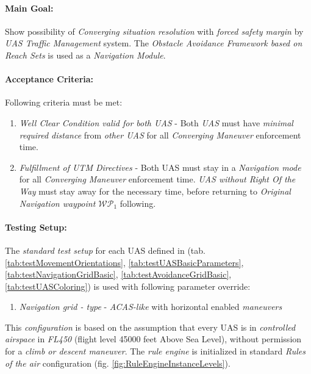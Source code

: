 \paragraph{Main Goal:} Show possibility of \emph{Converging situation resolution} with \emph{forced safety margin} by \emph{UAS Traffic Management} system.  The \emph{Obstacle Avoidance Framework based on Reach Sets} is used as a \emph{Navigation Module}.

\paragraph{Acceptance  Criteria:} Following criteria must be met:

\begin{enumerate}
	\item \emph{Well Clear Condition valid for both UAS} - Both \emph{UAS} must have \emph{minimal required distance} from \emph{other UAS} for all \emph{Converging Maneuver} enforcement time.
	
	\item \emph{Fulfillment of UTM Directives} - Both UAS must stay in a \emph{Navigation mode} for all \emph{Converging Maneuver} enforcement time. \emph{UAS without Right Of the Way} must stay away for the necessary time, before returning to \emph{Original Navigation waypoint $\mathscr{WP}_1$} following.
\end{enumerate}


\paragraph{Testing Setup:} The \emph{standard test setup} for each UAS defined in (tab. \ref{tab:testMovementOrientations}, \ref{tab:testUASBasicParameters}, \ref{tab:testNavigationGridBasic}, \ref{tab:testAvoidanceGridBasic}, \ref{tab:testUASColoring}) is used with following parameter override:
\begin{enumerate}
	\item \emph{Navigation grid - type} - \emph{ACAS-like} with horizontal enabled  \emph{maneuvers}
\end{enumerate}

This \emph{configuration} is based on the assumption that every UAS is in \emph{controlled airspace} in \emph{FL450} (flight level 45000 feet Above Sea Level), without permission for a \emph{climb or descent maneuver}. The \emph{rule engine} is initialized in standard \emph{Rules of the air} configuration (fig. \ref{fig:RuleEngineInstanceLevels}).


